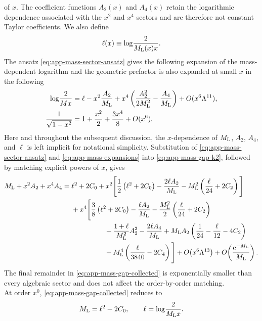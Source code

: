 \documentclass[a4paper,11pt]{article}
\newcommand{\e}{\mathrm e}
\begin{document}
of $x$.  The coefficient functions $A_2(x)$ and $A_4(x)$ retain the
logarithmic dependence associated with the $x^2$ and $x^4$ sectors and
are therefore not constant Taylor coefficients.  We also define
\begin{equation}
	\ell(x)\equiv
	\log\!\frac{2}{M_{\rm L}(x)x}.
\end{equation}
The ansatz \eqref{eq:app-mass-sector-ansatz} gives the following
expansion of the mass-dependent logarithm and the geometric prefactor is also expanded at small $x$ in the following
\begin{align}
	\log\!\frac{2}{Mx}
	={}&
	\ell
	-x^2\frac{A_2}{M_{\rm L}}
	+x^4
	\left(
	\frac{A_2^2}{2M_{\rm L}^2}
	-\frac{A_4}{M_{\rm L}}
	\right)
	+O(x^6\Lambda^{11}),
	\nonumber\\
	\frac1{\sqrt{1-x^2}}
	={}&
	1+\frac{x^2}{2}
	+\frac{3x^4}{8}
	+O(x^6),
	\label{eq:app-mass-expansions}
\end{align}
Here and throughout the subsequent discussion, the $x$-dependence of $M_{\rm L}$, $A_2$, $A_4$, and $\ell$ is left implicit for notational simplicity.
Substitution of \eqref{eq:app-mass-sector-ansatz} and
\eqref{eq:app-mass-expansions} into \eqref{eq:app-mass-gap-k2}, followed
by matching explicit powers of $x$, gives
\begin{align}
	M_{\rm L}+x^2A_2+x^4A_4
	={}&\ell^2+2C_0
	+x^2\Bigg[
	\frac12\left(\ell^2+2C_0\right)
	-\frac{2\ell A_2}{M_{\rm L}}
	-M_{\rm L}^2\left(\frac{\ell}{24}+2C_2\right)
	\Bigg]
	\nonumber\\
	&+x^4\Bigg[
	\frac38\left(\ell^2+2C_0\right)
	-\frac{\ell A_2}{M_{\rm L}}
	-\frac{M_{\rm L}^2}{2}
	\left(\frac{\ell}{24}+2C_2\right)
	\nonumber\\
	&\hspace{17mm}
	+\frac{1+\ell}{M_{\rm L}^2}A_2^2
	-\frac{2\ell A_4}{M_{\rm L}}
	+M_{\rm L}A_2
	\left(\frac1{24}-\frac{\ell}{12}-4C_2\right)
	\nonumber\\
	&\hspace{17mm}
	+M_{\rm L}^4
	\left(\frac{\ell}{3840}-2C_4\right)
	\Bigg]
	+O\!\left(x^6\Lambda^{13}\right)
	+O\!\left(\frac{\e^{-M_{\rm L}}}{M_{\rm L}}\right).
	\label{eq:app-mass-gap-collected}
\end{align}
The final remainder in \eqref{eq:app-mass-gap-collected} is
exponentially smaller than every algebraic sector and does not affect
the order-by-order matching.\\
At order $x^0$, \eqref{eq:app-mass-gap-collected} reduces to
\begin{equation}
	M_{\rm L}
	=
	\ell^2+2C_0,
	\qquad
	\ell
	=
	\log\!\frac{2}{M_{\rm L}x}.
	\label{eq:app-mass-leading-sector}
\end{equation}
\end{document}
